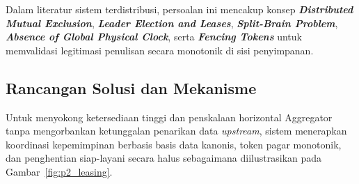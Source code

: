 \vspace{1em}

\noindent Dalam literatur sistem terdistribusi, persoalan ini mencakup konsep \textbf{\textit{Distributed Mutual Exclusion}}, \textbf{\textit{Leader Election and Leases}}, \textbf{\textit{Split-Brain Problem}}, \textbf{\textit{Absence of Global Physical Clock}}, serta \textbf{\textit{Fencing Tokens}} untuk memvalidasi legitimasi penulisan secara monotonik di sisi penyimpanan.

\subsection{Rancangan Solusi dan Mekanisme}
Untuk menyokong ketersediaan tinggi dan penskalaan horizontal Aggregator tanpa mengorbankan ketunggalan penarikan data \textit{upstream}, sistem menerapkan koordinasi kepemimpinan berbasis basis data kanonis, token pagar monotonik, dan penghentian siap-layani secara halus \cite{kleppmann2017designing,burns2018designing} sebagaimana diilustrasikan pada Gambar~\ref{fig:p2_leasing}.

